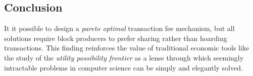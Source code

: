\documentclass[oneside]{article}   	%
\begin{document}
\subsection*{Conclusion}

It it possible to design a \textit{pareto optimal} transaction fee mechanism, but all solutions require block producers to prefer sharing rather than hoarding transactions. This finding reinforces the value of traditional economic tools like the study of the \textit{utility possibility frontier} as a lense through which seemingly intractable problems in computer science can be simply and elegantly solved.

\pagebreak

\nocite{*}
\end{document}
